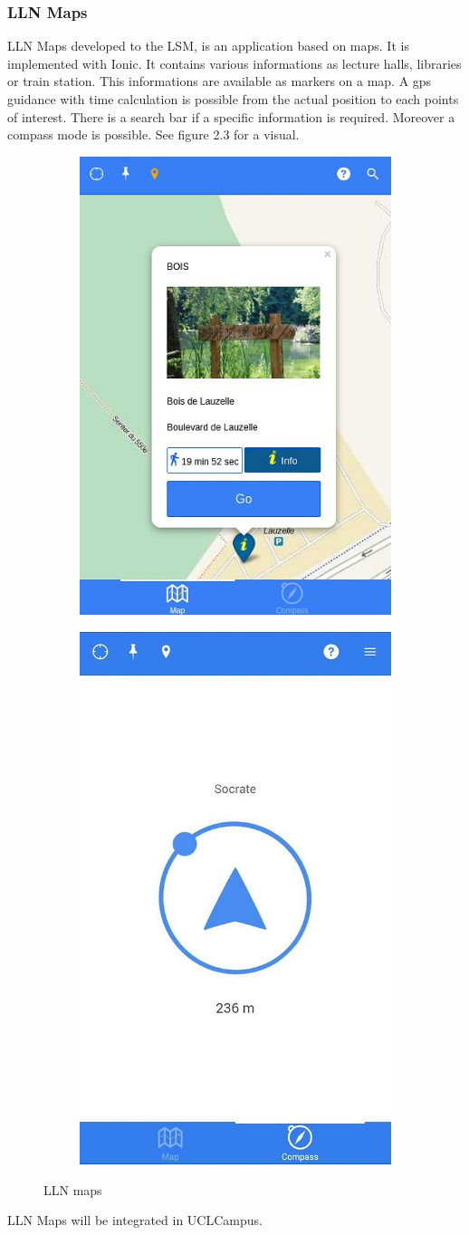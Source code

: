 \documentclass[11pt, a4paper]{report}
\begin{document}
\subsubsection{LLN Maps}
LLN Maps developed to the LSM, is an application based on maps. It is implemented with Ionic. It contains various informations as lecture halls, libraries or train station. This informations are available as markers on a map. A gps guidance with time calculation is possible from the actual position to each points of interest. There is a search bar if a specific information is required. Moreover a compass mode is possible. See figure 2.3 for a visual.  
\begin{figure}
\centering
\begin{subfigure}{.5\textwidth}
  \centering
  \includegraphics[width=.5\linewidth]{Images/llnmaps1.jpg}
  \label{fig:sub1}
\end{subfigure}%
\begin{subfigure}{.5\textwidth}
  \centering
  \includegraphics[width=.5\linewidth]{Images/llnmaps2.jpg}
  \label{fig:sub2}
\end{subfigure}
\caption{LLN maps}
\label{fig:test}
\end{figure}
LLN Maps will be integrated in UCLCampus. 
\end{document}
